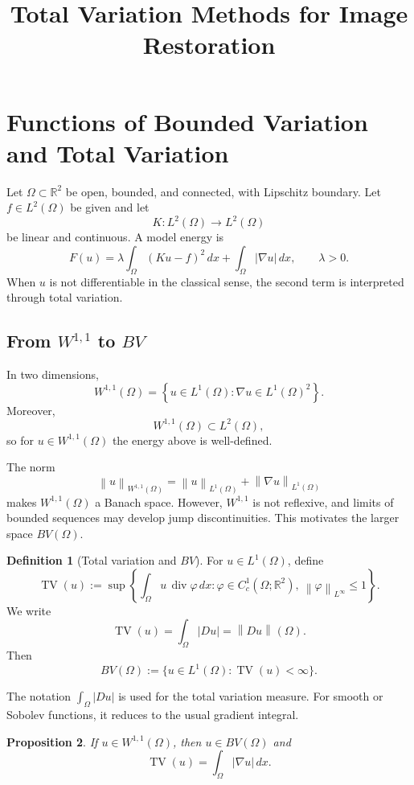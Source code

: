 \documentclass[11pt]{article}
\title{\textbf{Total Variation Methods for Image Restoration}}
\author{}
\date{}
\newcommand{\Om}{\Omega}
\newcommand{\R}{\mathbb{R}}
\newcommand{\TV}{\operatorname{TV}}
\newcommand{\Div}{\operatorname{div}}
\newcommand{\norm}[2][]{\left\lVert #2\right\rVert_{#1}}
\theoremstyle{definition}
\newtheorem{definition}{Definition}[section]
\theoremstyle{plain}
\newtheorem{proposition}[definition]{Proposition}
\begin{document}
\maketitle
\vspace{-1em}



\tableofcontents
\newpage

\section{Functions of Bounded Variation and Total Variation}

Let $\Om\subset\R^2$ be open, bounded, and connected, with Lipschitz boundary. Let $f\in L^2(\Om)$ be given and let
\[
K:L^2(\Om)\to L^2(\Om)
\]
be linear and continuous. A model energy is
\[
F(u)=\lambda\int_{\Om}(Ku-f)^2\,dx+\int_{\Om}|\nabla u|\,dx,
\qquad \lambda>0.
\]
When $u$ is not differentiable in the classical sense, the second term is interpreted through total variation.

\subsection{From $W^{1,1}$ to $BV$}
In two dimensions,
\[
W^{1,1}(\Om)
=\left\{u\in L^1(\Om):\nabla u\in L^1(\Om)^2\right\}.
\]
Moreover,
\[
W^{1,1}(\Om)\subset L^2(\Om),
\]
so for $u\in W^{1,1}(\Om)$ the energy above is well-defined.

The norm
\[
\norm[W^{1,1}(\Om)]{u}
=\norm[L^1(\Om)]{u}+\norm[L^1(\Om)]{\nabla u}
\]
makes $W^{1,1}(\Om)$ a Banach space. However, $W^{1,1}$ is not reflexive, and limits of bounded sequences may develop jump discontinuities. This motivates the larger space $BV(\Om)$.

\begin{definition}[Total variation and $BV$]
For $u\in L^1(\Om)$, define
\[
\TV(u)
:=\sup\left\{
\int_{\Om}u\,\Div\varphi\,dx:
\varphi\in C_c^1(\Om;\R^2),\ \norm[L^\infty]{\varphi}\le 1
\right\}.
\]
We write
\[
\TV(u)=\int_{\Om}|Du|=\norm{Du}(\Om).
\]
Then
\[
BV(\Om):=\{u\in L^1(\Om):\TV(u)<\infty\}.
\]
\end{definition}

The notation $\int_{\Om}|Du|$ is used for the total variation measure. For smooth or Sobolev functions, it reduces to the usual gradient integral.

\begin{proposition}
If $u\in W^{1,1}(\Om)$, then $u\in BV(\Om)$ and
\[
\TV(u)=\int_{\Om}|\nabla u|\,dx.
\]
\end{proposition}
\end{document}
